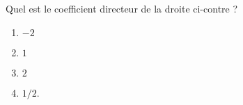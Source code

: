 
\begin{exercice}\label{exosmath-0393}

    \begin{minipage}{0.485\textwidth}

    Quel est le coefficient directeur de la droite ci-contre ?

        \begin{enumerate}
            \item
                \( -2\)
            \item
                \( 1\)
            \item
                \( 2\)
            \item
                \( 1/2\).
        \end{enumerate}
    \end{minipage}
    \hspace{1mm}    
    \begin{minipage}{0.485\textwidth}
\begin{center}

\end{center}
    \end{minipage}

\end{exercice}

